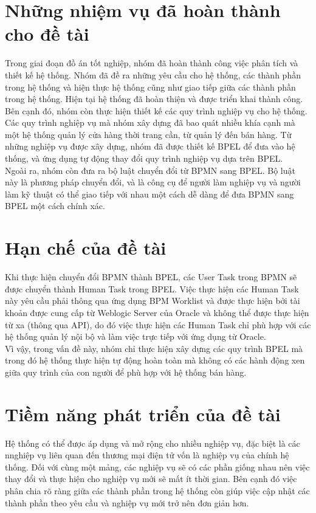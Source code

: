 \section{Những nhiệm vụ đã hoàn thành cho đề tài}
\hspace{0.5cm} Trong giai đoạn đồ án tốt nghiệp, nhóm đã hoàn thành công việc phân tích và thiết kế hệ thống. Nhóm đã đề ra những yêu cầu cho hệ thống, các thành phần trong hệ thống và hiện thực hệ thống cũng như giao tiếp giữa các thành phần trong hệ thống. Hiện tại hệ thống đã hoàn thiện và được triển khai thành công.\\

Bên cạnh đó, nhóm còn thực hiện thiết kế các quy trình nghiệp vụ cho hệ thống. Các quy trình nghiệp vụ mà nhóm xây dựng đã bao quát nhiều khía cạnh mà một hệ thống quản lý cửa hàng thời trang cần, từ quản lý đến bán hàng. Từ những nghiệp vụ được xây dựng, nhóm đã được thiết kế BPEL để đưa vào hệ thống, và ứng dụng tự động thay đổi quy trình nghiệp vụ dựa trên BPEL.\\

Ngoài ra, nhóm còn đưa ra bộ luật chuyển đổi từ BPMN sang BPEL. Bộ luật này là phương pháp chuyển đổi, và là công cụ để người làm nghiệp vụ và người làm kỹ thuật có thể giao tiếp với nhau một cách dễ dàng để đưa BPMN sang BPEL một cách chính xác.



\section{Hạn chế của đề tài}
\hspace{0.5cm} Khi thực hiện chuyển đổi BPMN thành BPEL, các User Task trong BPMN sẽ được chuyển thành Human Task trong BPEL. Việc thực hiện các Human Task này yêu cầu phải thông qua ứng dụng BPM Worklist và được thực hiện bởi tài khoản được cung cấp từ Weblogic Server của Oracle và không thể được thực hiện từ xa (thông qua API), do đó việc thực hiện các Human Task chỉ phù hợp với các hệ thống quản lý nội bộ và làm việc trực tiếp với ứng dụng từ Oracle.\\

Vì vậy, trong vấn đề này, nhóm chỉ thực hiện xây dựng các quy trình BPEL mà trong đó hệ thống thực hiện tự động hoàn toàn mà không có các hành động xen giữa quy trình của con người để phù hợp với hệ thống bán hàng.

\section{Tiềm năng phát triển của đề tài}
\hspace{0.5cm} Hệ thống có thể được áp dụng và mở rộng cho nhiều nghiệp vụ, đặc biệt là các nnghiệp vụ liên quan đến thương mại điện tử vốn là nghiệp vụ của chính hệ thống. Đối với cùng một mảng, các nghiệp vụ sẽ có các phần giống nhau nên việc thay đổi và thực hiện cho nghiệp vụ mới sẽ mất ít thời gian. Bên cạnh đó việc phân chia rõ ràng giữa các thành phần trong hệ thống còn giúp việc cập nhật các thành phần theo yêu cầu và nghiệp vụ mới trở nên đơn giản hơn.\\


